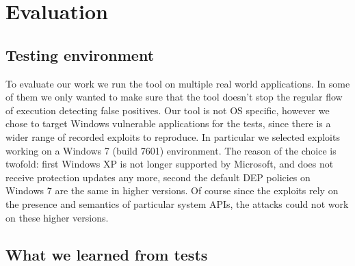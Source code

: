 \documentclass[Lau,binding=0.6cm]{sapthesis}
\begin{document}
\chapter{Evaluation}

\section{Testing environment}
To evaluate our work we run the tool on multiple real world applications. In some of them we only wanted to make sure that the tool doesn’t stop the regular flow of execution detecting false positives. Our tool is not OS specific, however we chose to target Windows vulnerable applications for the tests, since there is a wider range of recorded exploits to reproduce. In particular we selected exploits working on a Windows 7 (build 7601) environment. The reason of the choice is twofold: first Windows XP is not longer supported by Microsoft, and does not receive protection updates any more, second the default DEP policies on Windows 7 are the same in higher versions. Of course since the exploits rely on the presence and semantics of particular system APIs, the attacks could not work on these higher versions.

\section{What we learned from tests}
\end{document}
